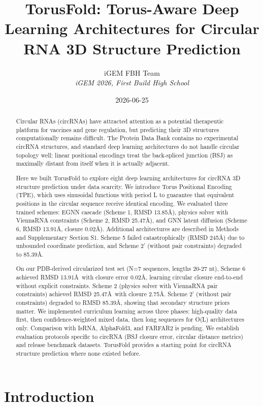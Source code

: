 \documentclass[12pt]{article}
\title{TorusFold: Torus-Aware Deep Learning Architectures for Circular RNA 3D Structure Prediction}
\author{
iGEM FBH Team\\
\textit{iGEM 2026, First Build High School}
}
\date{2026-06-25}
\begin{document}
\maketitle

\begin{abstract}
Circular RNAs (circRNAs) have attracted attention as a potential therapeutic platform for vaccines and gene regulation, but predicting their 3D structures computationally remains difficult. The Protein Data Bank contains no experimental circRNA structures, and standard deep learning architectures do not handle circular topology well: linear positional encodings treat the back-spliced junction (BSJ) as maximally distant from itself when it is actually adjacent.

Here we built TorusFold to explore eight deep learning architectures for circRNA 3D structure prediction under data scarcity. We introduce Torus Positional Encoding (TPE), which uses sinusoidal functions with period L to guarantee that equivalent positions in the circular sequence receive identical encoding. We evaluated three trained schemes: EGNN cascade (Scheme 1, RMSD 13.85\AA), physics solver with ViennaRNA constraints (Scheme 2, RMSD 25.47\AA), and GNN latent diffusion (Scheme 6, RMSD 13.91\AA, closure 0.02\AA). Additional architectures are described in Methods and Supplementary Section S1. Scheme 5 failed catastrophically (RMSD 245\AA) due to unbounded coordinate prediction, and Scheme 2' (without pair constraints) degraded to 85.39\AA.

On our PDB-derived circularized test set (N=7 sequences, lengths 20-27 nt), Scheme 6 achieved RMSD 13.91\AA\ with closure error 0.02\AA, learning circular closure end-to-end without explicit constraints. Scheme 2 (physics solver with ViennaRNA pair constraints) achieved RMSD 25.47\AA\ with closure 2.75\AA. Scheme 2' (without pair constraints) degraded to RMSD 85.39\AA, showing that secondary structure priors matter. We implemented curriculum learning across three phases: high-quality data first, then confidence-weighted mixed data, then long sequences for O(L) architectures only. Comparison with IsRNA, AlphaFold3, and FARFAR2 is pending. We establish evaluation protocols specific to circRNA (BSJ closure error, circular distance metrics) and release benchmark datasets. TorusFold provides a starting point for circRNA structure prediction where none existed before.
\end{abstract}

\section{Introduction}
\end{document}
